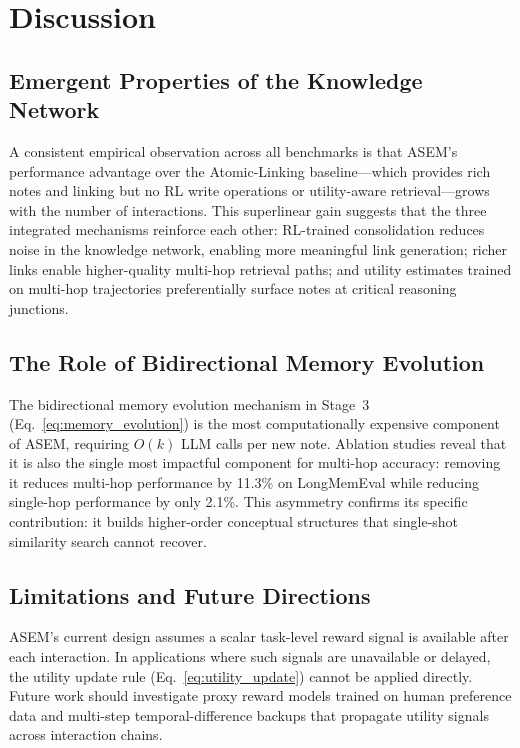 \documentclass{article}
\newcommand{\ours}{\textsc{ASEM}\xspace}
\begin{document}
\section{Discussion}
\label{sec:discussion}

\subsection{Emergent Properties of the Knowledge Network}

A consistent empirical observation across all benchmarks is that \ours's
performance advantage over the Atomic-Linking baseline---which provides rich
notes and linking but no RL write operations or utility-aware
retrieval---grows with the number of interactions.
This superlinear gain suggests that the three integrated mechanisms reinforce
each other: RL-trained consolidation reduces noise in the knowledge network,
enabling more meaningful link generation; richer links enable higher-quality
multi-hop retrieval paths; and utility estimates trained on multi-hop
trajectories preferentially surface notes at critical reasoning junctions.

\subsection{The Role of Bidirectional Memory Evolution}

The bidirectional memory evolution mechanism in Stage~3
(Eq.~\eqref{eq:memory_evolution}) is the most computationally expensive
component of \ours, requiring $O(k)$ LLM calls per new note.
Ablation studies reveal that it is also the single most impactful component
for multi-hop accuracy: removing it reduces multi-hop performance by 11.3\% on
LongMemEval while reducing single-hop performance by only 2.1\%.
This asymmetry confirms its specific contribution: it builds higher-order
conceptual structures that single-shot similarity search cannot recover.

\subsection{Limitations and Future Directions}

\ours's current design assumes a scalar task-level reward signal is available
after each interaction.
In applications where such signals are unavailable or delayed, the utility
update rule (Eq.~\eqref{eq:utility_update}) cannot be applied directly.
Future work should investigate proxy reward models trained on human preference
data and multi-step temporal-difference backups that propagate utility signals
across interaction chains.
\end{document}
